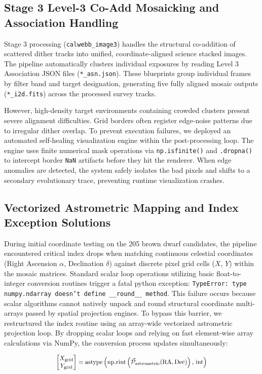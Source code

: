 \documentclass[twocolumn]{aastex63}
\begin{document}
\subsection{Stage 3 Level-3 Co-Add Mosaicking and Association Handling}
Stage 3 processing (\texttt{calwebb\_image3}) handles the structural co-addition of scattered dither tracks into unified, coordinate-aligned science stacked images. The pipeline automatically clusters individual exposures by reading Level 3 Association JSON files (\texttt{*\_asn.json}). These blueprints group individual frames by filter band and target designation, generating five fully aligned mosaic outputs (\texttt{*\_i2d.fits}) across the processed survey tracks. 

However, high-density target environments containing crowded clusters present severe alignment difficulties. Grid borders often register edge-noise patterns due to irregular dither overlap. To prevent execution failures, we deployed an automated self-healing visualization engine within the post-processing loop. The engine uses finite numerical mask operations via \texttt{np.isfinite()} and \texttt{.dropna()} to intercept border \texttt{NaN} artifacts before they hit the renderer. When edge anomalies are detected, the system safely isolates the bad pixels and shifts to a secondary evolutionary trace, preventing runtime visualization crashes.

\subsection{Vectorized Astrometric Mapping and Index Exception Solutions}
During initial coordinate testing on the 205 brown dwarf candidates, the pipeline encountered critical index drops when matching continuous celestial coordinates (Right Ascension $\alpha$, Declination $\delta$) against discrete pixel grid cells ($X$, $Y$) within the mosaic matrices. Standard scalar loop operations utilizing basic float-to-integer conversion routines trigger a fatal python exception: \texttt{TypeError: type numpy.ndarray doesn't define \_\_round\_\_ method}. This failure occurs because scalar algorithms cannot natively unpack and round structural coordinate multi-arrays passed by spatial projection engines. To bypass this barrier, we restructured the index routine using an array-wide vectorized astrometric projection loop. By dropping scalar loops and relying on fast element-wise array calculations via NumPy, the conversion process updates simultaneously:

\begin{equation}
\scalebox{0.88}{%
$\begin{bmatrix} X_{\text{grid}} \\ Y_{\text{grid}} \end{bmatrix} = \text{astype}\left(\text{np.rint}\left(\vec{\mathcal{P}}_{\text{astrometric}}(\text{RA}, \text{Dec})\right), \, \text{int}\right)$%
}
\end{equation}
\end{document}

